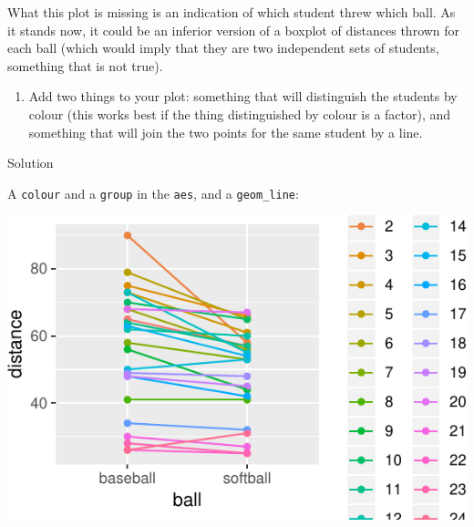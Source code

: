 \documentclass[]{tufte-book}
\newenvironment{Shaded}{}{}
\newcommand{\DataTypeTok}[1]{\textcolor[rgb]{0.56,0.13,0.00}{#1}}
\newcommand{\KeywordTok}[1]{\textcolor[rgb]{0.00,0.44,0.13}{\textbf{#1}}}
\newcommand{\NormalTok}[1]{#1}
\newcommand{\OperatorTok}[1]{\textcolor[rgb]{0.40,0.40,0.40}{#1}}
\newcommand{\StringTok}[1]{\textcolor[rgb]{0.25,0.44,0.63}{#1}}
\providecommand{\tightlist}{%
  \setlength{\itemsep}{0pt}\setlength{\parskip}{0pt}}
\theoremstyle{definition}
\theoremstyle{definition}
\theoremstyle{definition}
\theoremstyle{remark}
\begin{document}
What this plot is missing is an indication of which student threw which
ball. As it stands now, it could be an inferior version of a boxplot of
distances thrown for each ball (which would imply that they are two
independent sets of students, something that is not true).

\begin{enumerate}
\def\labelenumi{(\alph{enumi})}
\setcounter{enumi}{4}
\tightlist
\item
  Add two things to your plot: something that will distinguish the
  students by colour (this works best if the thing distinguished by
  colour is a factor), 
  and something that will join the two points for the same student by a
  line.
\end{enumerate}

Solution

A \texttt{colour} and a \texttt{group} in the \texttt{aes}, and a
\texttt{geom\_line}:

\begin{Shaded}
\end{Shaded}

\includegraphics{11-tidying-and-selecting-data_files/figure-latex/unnamed-chunk-19-1}
\end{document}

